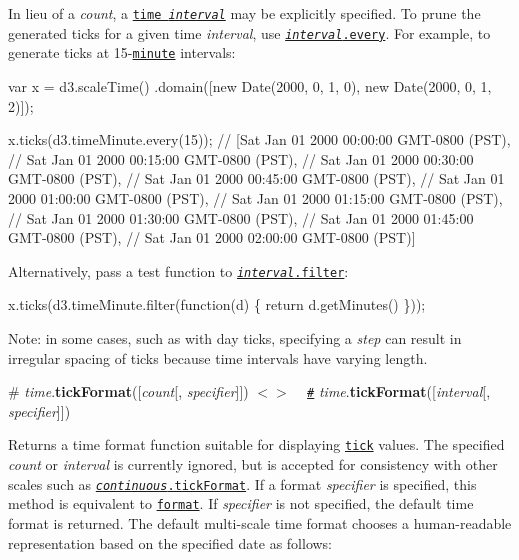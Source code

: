 In lieu of a {\itshape count}, a \href{https://github.com/d3/d3-time#intervals}{\tt time {\itshape interval}} may be explicitly specified. To prune the generated ticks for a given time {\itshape interval}, use \href{https://github.com/d3/d3-time#interval_every}{\tt {\itshape interval}.every}. For example, to generate ticks at 15-\/\href{https://github.com/d3/d3-time#minute}{\tt minute} intervals\+:


\begin{DoxyCode}
var x = d3.scaleTime()
    .domain([new Date(2000, 0, 1, 0), new Date(2000, 0, 1, 2)]);

x.ticks(d3.timeMinute.every(15));
// [Sat Jan 01 2000 00:00:00 GMT-0800 (PST),
//  Sat Jan 01 2000 00:15:00 GMT-0800 (PST),
//  Sat Jan 01 2000 00:30:00 GMT-0800 (PST),
//  Sat Jan 01 2000 00:45:00 GMT-0800 (PST),
//  Sat Jan 01 2000 01:00:00 GMT-0800 (PST),
//  Sat Jan 01 2000 01:15:00 GMT-0800 (PST),
//  Sat Jan 01 2000 01:30:00 GMT-0800 (PST),
//  Sat Jan 01 2000 01:45:00 GMT-0800 (PST),
//  Sat Jan 01 2000 02:00:00 GMT-0800 (PST)]
\end{DoxyCode}


Alternatively, pass a test function to \href{https://github.com/d3/d3-time#interval_filter}{\tt {\itshape interval}.filter}\+:


\begin{DoxyCode}
x.ticks(d3.timeMinute.filter(function(d) \{
  return d.getMinutes() %
\}));
\end{DoxyCode}


Note\+: in some cases, such as with day ticks, specifying a {\itshape step} can result in irregular spacing of ticks because time intervals have varying length.

\label{_time_tickFormat}%
\# {\itshape time}.{\bfseries tick\+Format}(\mbox{[}{\itshape count}\mbox{[}, {\itshape specifier}\mbox{]}\mbox{]}) \href{https://github.com/d3/d3-scale/blob/master/src/time.js#L115}{\tt $<$$>$} ~\newline
\href{#time_tickFormat}{\tt \#} {\itshape time}.{\bfseries tick\+Format}(\mbox{[}{\itshape interval}\mbox{[}, {\itshape specifier}\mbox{]}\mbox{]})

Returns a time format function suitable for displaying \href{#time_ticks}{\tt tick} values. The specified {\itshape count} or {\itshape interval} is currently ignored, but is accepted for consistency with other scales such as \href{#continuous_tickFormat}{\tt {\itshape continuous}.tick\+Format}. If a format {\itshape specifier} is specified, this method is equivalent to \href{https://github.com/d3/d3-time-format#format}{\tt format}. If {\itshape specifier} is not specified, the default time format is returned. The default multi-\/scale time format chooses a human-\/readable representation based on the specified date as follows\+:


